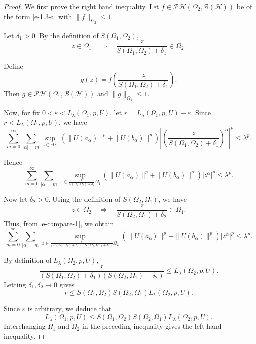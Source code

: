 \documentclass[10pt,a4paper]{amsart}
\begin{document}
\begin{proof}
We first prove the right hand inequality.
Let $f \in \mathcal{PH}(\Omega_2,\mathcal{B}(\mathcal{H}))$ be of the form \eqref{e-1.3-a} with $\|f\|_{\Omega_2} \le 1$.

Let $\delta_1>0$.  
By the definition of $S(\Omega_1,\Omega_2)$,
\[
z \in \Omega_1
\quad \Rightarrow \quad
\frac{z}{S(\Omega_1,\Omega_2)+\delta_1} \in \Omega_2.
\]

Define
\[
g(z)=f\!\left(
\frac{z}{S(\Omega_1,\Omega_2)+\delta_1}
\right).
\]
Then $g \in \mathcal{PH}(\Omega_1,\mathcal{B}(\mathcal{H}))$
and $\|g\|_{\Omega_1}\le 1$.
\par
Now, for fix $0<\varepsilon<L_{\lambda}(\Omega_1,p,U)$, let $r = L_{\lambda}(\Omega_1,p,U)-\varepsilon$.
Since $r<L_{\lambda}(\Omega_1,p,U)$, we have
\[
\sum_{m=0}^{\infty}\sum_{|\alpha|=m}
\sup_{z\in r\Omega_1}
(\|U(a_\alpha)\|^p+\|U(b_\alpha)\|^p)
\left|
\left(
\frac{z}{S(\Omega_1,\Omega_2)+\delta_1}
\right)^\alpha
\right|^p
\le \lambda^p.
\]

Hence
\begin{equation} \label{e-compare-1}
\sum_{m=0}^{\infty}\sum_{|\alpha|=m}
\sup_{z\in \frac{r}{S(\Omega_1,\Omega_2)+\delta_1}\Omega_1}
(\|U(a_\alpha)\|^p+\|U(b_\alpha)\|^p)
|z^\alpha|^p
\le \lambda^p.
\end{equation}

Now let $\delta_2>0$.  
Using the definition of $S(\Omega_2,\Omega_1)$, we have
\[
z \in \Omega_2
\quad \Rightarrow \quad
\frac{z}{S(\Omega_2,\Omega_1)+\delta_2} \in \Omega_1.
\]
Thus, from \eqref{e-compare-1}, we obtain
\[
\sum_{m=0}^{\infty}\sum_{|\alpha|=m}
\sup_{z\in
	\frac{r}{(S(\Omega_1,\Omega_2)+\delta_1)(S(\Omega_2,\Omega_1)+\delta_2)}
	\Omega_2}
(\|U(a_\alpha)\|^p+\|U(b_\alpha)\|^p)
|z^\alpha|^p
\le \lambda^p.
\]

By definition of $L_{\lambda}(\Omega_2,p,U)$,
\[
\frac{r}
{(S(\Omega_1,\Omega_2)+\delta_1)(S(\Omega_2,\Omega_1)+\delta_2)}
\le
L_{\lambda}(\Omega_2,p,U).
\]
Letting $\delta_1,\delta_2 \to 0$ gives
\[
r
\le
S(\Omega_1,\Omega_2)S(\Omega_2,\Omega_1)
L_{\lambda}(\Omega_2,p,U).
\]

Since $\varepsilon$ is arbitrary, we deduce that
\[
L_{\lambda}(\Omega_1,p,U)
\le
S(\Omega_1,\Omega_2)S(\Omega_2,\Omega_1)
L_{\lambda}(\Omega_2,p,U).
\]
Interchanging $\Omega_1$ and $\Omega_2$ in the preceding inequality gives the left hand inequality. 
\end{proof}
\end{document}
